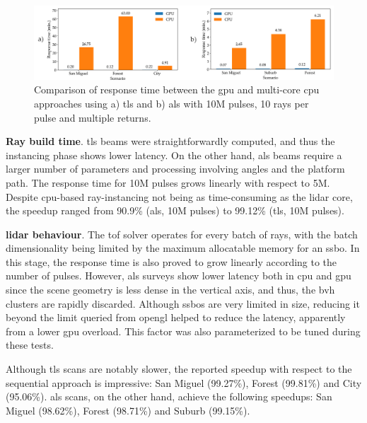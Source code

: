 \begin{figure} [ht]
	\centering
	\includegraphics[width=\linewidth]{figs/lidar_simulation/response_time.png}
	\caption{Comparison of response time between the \acrshort{gpu} and multi-core \acrshort{cpu} approaches using a) \acrshort{tls} and b) \acrshort{als} with 10M pulses, 10 rays per pulse and multiple returns. }
	\label{fig:lidar_response_time_global}
\end{figure}

\textbf{Ray build time}. \acrshort{tls} beams were straightforwardly computed, and thus the instancing phase shows lower latency. On the other hand, \acrshort{als} beams require a larger number of parameters and processing involving angles and the platform path. The response time for 10M pulses grows linearly with respect to 5M. Despite \acrshort{cpu}-based ray-instancing not being as time-consuming as the \acrshort{lidar} core, the speedup ranged from 90.9\% (\acrshort{als}, 10M pulses) to 99.12\% (\acrshort{tls}, 10M pulses).

\textbf{\acrshort{lidar} behaviour}. The \acrshort{tof} solver operates for every batch of rays, with the batch dimensionality being limited by the maximum allocatable memory for an \acrshort{ssbo}. In this stage, the response time is also proved to grow linearly according to the number of pulses. However, \acrshort{als} surveys show lower latency both in \acrshort{cpu} and \acrshort{gpu} since the scene geometry is less dense in the vertical axis, and thus, the \acrshort{bvh} clusters are rapidly discarded. Although \acrshort{ssbo}s are very limited in size, reducing it beyond the limit queried from \acrshort{opengl} helped to reduce the latency, apparently from a lower \acrshort{gpu} overload. This factor was also parameterized to be tuned during these tests.

Although \acrshort{tls} scans are notably slower, the reported speedup with respect to the sequential approach is impressive: San Miguel (99.27\%), Forest (99.81\%) and City (95.06\%). \acrshort{als} scans, on the other hand, achieve the following speedups: San Miguel (98.62\%), Forest (98.71\%) and Suburb (99.15\%).

